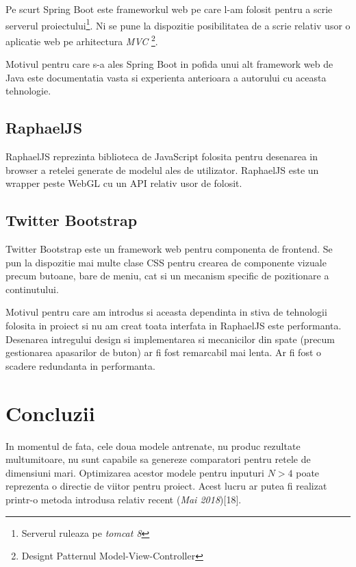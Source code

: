\documentclass[12pt]{article}
\begin{document}
Pe scurt Spring Boot este frameworkul web pe care l-am folosit pentru a scrie serverul proiectului\footnote{Serverul ruleaza pe \textit{tomcat 8}}. Ni se pune la dispozitie posibilitatea de a scrie relativ usor o aplicatie web pe arhitectura \textit{MVC} \footnote{Designt Patternul Model-View-Controller}. 

Motivul pentru care s-a ales Spring Boot in pofida unui alt framework web de Java este documentatia vasta si experienta anterioara a autorului cu aceasta tehnologie.

\subsection{RaphaelJS}

RaphaelJS reprezinta biblioteca de JavaScript folosita pentru desenarea in browser a retelei generate de modelul ales de utilizator. RaphaelJS este un wrapper peste WebGL cu un API relativ usor de folosit.


\subsection{Twitter Bootstrap}

Twitter Bootstrap este un framework web pentru componenta de frontend. Se pun la dispozitie mai multe clase CSS pentru crearea de componente vizuale precum butoane, bare de meniu, cat si un mecanism specific de pozitionare a continutului.

Motivul pentru care am introdus si aceasta dependinta in stiva de tehnologii folosita in proiect si nu am creat toata interfata in RaphaelJS este performanta. Desenarea intregului design si implementarea si mecanicilor din spate (precum gestionarea apasarilor de buton) ar fi fost remarcabil mai lenta. Ar fi fost o scadere redundanta in performanta.

\pagebreak

\section{Concluzii}

 In momentul de fata, cele doua modele antrenate, nu produc rezultate multumitoare, nu sunt capabile sa genereze comparatori pentru retele de dimensiuni mari. Optimizarea acestor modele pentru inputuri $N>4$ poate reprezenta o directie de viitor pentru proiect. Acest lucru ar putea fi realizat printr-o metoda introdusa relativ recent (\textit{Mai 2018})[18].
\end{document}
